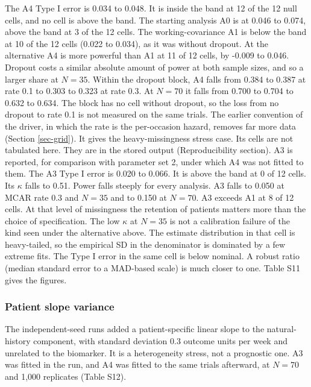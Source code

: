 \documentclass[
  11pt,
]{article}
\begin{document}
The A4 Type I error is 0.034 to
0.048. It is inside the band at
12 of the 12 null cells, and no cell is above
the band. The starting analysis A0 is at 0.046 to
0.074, above the band at
3 of the 12 cells. The working-covariance
A1 is below the band at
10 of the 12 cells (0.022
to 0.034), as it was without dropout. At the
alternative A4 is more powerful than A1 at
11 of 12 cells, by -0.009 to
0.046. Dropout costs a similar absolute amount of
power at both sample sizes, and so a larger share at \(N = 35\).
Within the dropout block, A4 falls from
0.384 to
0.387 at
rate 0.1 to
0.303 to
0.323 at
rate 0.3. At \(N = 70\) it falls from
0.700 to
0.704 to
0.632 to
0.634.
The block has no cell without dropout, so the loss from no dropout to
rate 0.1 is not measured on the same trials. The earlier convention
of the driver, in which the rate is the per-occasion hazard, removes
far more data (Section \ref{sec-grid}). It gives the
heavy-missingness stress case. Its cells are not tabulated here.
They are in the stored output (Reproducibility section). A3 is
reported, for comparison with parameter set 2, under which A4 was not
fitted to them. The A3 Type I error is
0.020 to 0.066. It is above
the band at 0 of 12 cells. Its \(\kappa\)
falls to 0.51. Power falls steeply for
every analysis. A3 falls to
0.050
at MCAR rate 0.3 and \(N = 35\) and to
0.150
at \(N = 70\). A3 exceeds A1 at 8 of 12 cells.
At that level of missingness the retention of patients matters more
than the choice of specification. The low \(\kappa\) at \(N = 35\) is
not a calibration failure of the kind seen under the alternative
above. The estimate distribution in that cell is heavy-tailed, so
the empirical SD in the denominator is dominated by a few extreme
fits. The Type I error in the same cell is below nominal. A robust
ratio (median standard error to a MAD-based scale) is much closer to
one. Table S11 gives the figures.

\subsubsection{Patient slope variance}\label{sec-trend}

The independent-seed runs added a patient-specific linear slope to the
natural-history component, with standard deviation 0.3 outcome units
per week and unrelated to the biomarker. It is a heterogeneity stress,
not a prognostic one. A3 was fitted in the run, and A4 was
fitted to the same trials afterward, at \(N = 70\) and 1,000 replicates
(Table S12).
\end{document}
